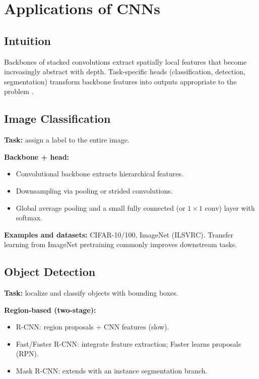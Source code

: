 
\section{Applications of CNNs }
\label{sec:cnn-applications}

\subsection*{Intuition}
Backbones of stacked convolutions extract spatially local features that become increasingly abstract with depth. Task-specific heads (classification, detection, segmentation) transform backbone features into outputs appropriate to the problem \cite{GoodfellowEtAl2016,Prince2023}.
\subsection{Image Classification}

\textbf{Task:} assign a label to the entire image.

\textbf{Backbone + head:}
\begin{itemize}
    \item Convolutional backbone extracts hierarchical features.
    \item Downsampling via pooling or strided convolutions.
    \item Global average pooling and a small fully connected (or $1\times1$ conv) layer with softmax.
\end{itemize}

\textbf{Examples and datasets:} CIFAR-10/100, ImageNet (ILSVRC). Transfer learning from ImageNet pretraining commonly improves downstream tasks.

\subsection{Object Detection}

\textbf{Task:} localize and classify objects with bounding boxes.

\textbf{Region-based (two-stage):}
\begin{itemize}
    \item R-CNN: region proposals + CNN features (slow).
    \item Fast/Faster R-CNN: integrate feature extraction; Faster learns proposals (RPN).
    \item Mask R-CNN: extends with an instance segmentation branch.
\end{itemize}

